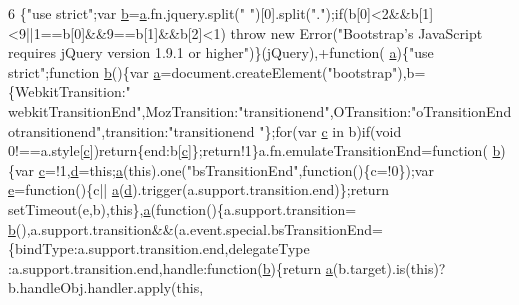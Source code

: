 \begin{DoxyCode}
6 \{\textcolor{stringliteral}{"use strict"};var \hyperlink{a00029_ac0431efac4d7c393d1e70b86115cb93f}{b}=\hyperlink{a00029_ae8f6b400ed3390908c5cdeebed3a82b9}{a}.fn.jquery.split(\textcolor{stringliteral}{" "})[0].split(\textcolor{stringliteral}{"."});\textcolor{keywordflow}{if}(b[0]<2&&b[1]<9||1==b[0]&&9==b[1]&&b[2]<1)\textcolor{keywordflow}{
      throw} \textcolor{keyword}{new} Error(\textcolor{stringliteral}{"Bootstrap's JavaScript requires jQuery version 1.9.1 or higher"})\}(jQuery),+\textcolor{keyword}{function}(
      \hyperlink{a00029_ae8f6b400ed3390908c5cdeebed3a82b9}{a})\{\textcolor{stringliteral}{"use strict"};\textcolor{keyword}{function} \hyperlink{a00029_ac0431efac4d7c393d1e70b86115cb93f}{b}()\{var \hyperlink{a00029_ae8f6b400ed3390908c5cdeebed3a82b9}{a}=document.createElement(\textcolor{stringliteral}{"bootstrap"}),b=\{WebkitTransition:\textcolor{stringliteral}{"
      webkitTransitionEnd"},MozTransition:\textcolor{stringliteral}{"transitionend"},OTransition:\textcolor{stringliteral}{"oTransitionEnd otransitionend"},transition:\textcolor{stringliteral}{"transitionend
      "}\};\textcolor{keywordflow}{for}(var \hyperlink{a00029_ad9d1ac02e33c4aed62ad517a7cb8b3fb}{c} in b)\textcolor{keywordflow}{if}(\textcolor{keywordtype}{void} 0!==a.style[\hyperlink{a00029_ad9d1ac02e33c4aed62ad517a7cb8b3fb}{c}])\textcolor{keywordflow}{return}\{end:b[\hyperlink{a00029_ad9d1ac02e33c4aed62ad517a7cb8b3fb}{c}]\};\textcolor{keywordflow}{return}!1\}a.fn.emulateTransitionEnd=\textcolor{keyword}{function}(
      \hyperlink{a00029_ac0431efac4d7c393d1e70b86115cb93f}{b})\{var \hyperlink{a00029_ad9d1ac02e33c4aed62ad517a7cb8b3fb}{c}=!1,\hyperlink{a00029_aeb337d295abaddb5ec3cb34cc2e2bbc9}{d}=\textcolor{keyword}{this};\hyperlink{a00029_ae8f6b400ed3390908c5cdeebed3a82b9}{a}(\textcolor{keyword}{this}).one(\textcolor{stringliteral}{"bsTransitionEnd"},\textcolor{keyword}{function}()\{c=!0\});var \hyperlink{a00029_ab5902775854a8b8440bcd25e0fe1c120}{e}=\textcolor{keyword}{function}()\{c||
      \hyperlink{a00029_ae8f6b400ed3390908c5cdeebed3a82b9}{a}(\hyperlink{a00029_aeb337d295abaddb5ec3cb34cc2e2bbc9}{d}).trigger(a.support.transition.end)\};\textcolor{keywordflow}{return} setTimeout(e,b),\textcolor{keyword}{this}\},\hyperlink{a00029_ae8f6b400ed3390908c5cdeebed3a82b9}{a}(\textcolor{keyword}{function}()\{a.support.transition=
      \hyperlink{a00029_ac0431efac4d7c393d1e70b86115cb93f}{b}(),a.support.transition&&(a.event.special.bsTransitionEnd=\{bindType:a.support.transition.end,delegateType
      :a.support.transition.end,handle:\textcolor{keyword}{function}(\hyperlink{a00029_ac0431efac4d7c393d1e70b86115cb93f}{b})\{\textcolor{keywordflow}{return} \hyperlink{a00029_ae8f6b400ed3390908c5cdeebed3a82b9}{a}(b.target).is(\textcolor{keyword}{this})?b.handleObj.handler.apply(\textcolor{keyword}{this},

\end{DoxyCode}
